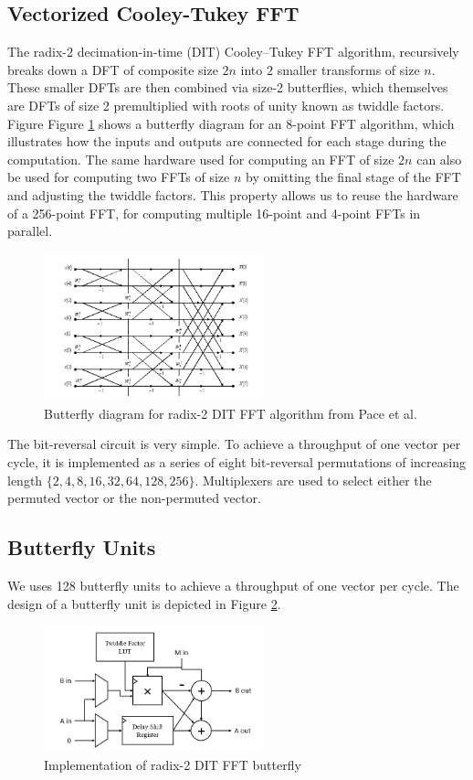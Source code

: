\documentclass[lettersize,journal]{IEEEtran}
\begin{document}
\subsection{Vectorized Cooley-Tukey FFT}
The radix-2 decimation-in-time (DIT) Cooley–Tukey FFT algorithm, recursively breaks down a DFT of composite size $2n$ into $2$ smaller transforms of size $n$. These smaller DFTs are then combined via size-2 butterflies, which themselves are DFTs of size 2 premultiplied with roots of unity known as twiddle factors. Figure Figure \ref{fig:dit_fft} shows a butterfly diagram for an 8-point FFT algorithm, which illustrates how the inputs and outputs are connected for each stage during the computation. The same hardware used for computing an FFT of size $2n$ can also be used for computing two FFTs of size $n$ by omitting the final stage of the FFT and adjusting the twiddle factors. This property allows us to reuse the hardware of a 256-point FFT, for computing multiple 16-point and 4-point FFTs in parallel.

\begin{figure}[h]
\centering
\includegraphics[width=2.5in]{img/dit_fft.png}
\caption{Butterfly diagram for radix-2 DIT FFT algorithm from Pace et al. \cite{ditfftimg}}
\label{fig:dit_fft}
\end{figure}

The bit-reversal circuit is very simple. To achieve a throughput of one vector per cycle, it is implemented as a series of eight bit-reversal permutations of increasing length $\{2, 4, 8, 16, 32, 64, 128, 256\}$. Multiplexers are used to select either the permuted vector or the non-permuted vector.

\subsection{Butterfly Units}

We uses 128 butterfly units to achieve a throughput of one vector per cycle. The design of a butterfly unit is depicted in Figure \ref{fig:dit_rader_butterfly}.

\begin{figure}[h]
\centering
\includegraphics[width=2.5in]{img/dit_rader_butterfly.png}
\caption{Implementation of radix-2 DIT FFT butterfly}
\label{fig:dit_rader_butterfly}
\end{figure}
\end{document}
